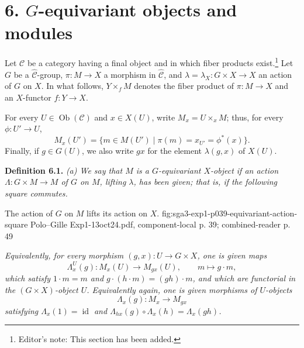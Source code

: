 
\section*{6. \(G\)-equivariant objects and modules}

Let \(\mathscr C\) be a category having a final object and in which fiber
products exist.\footnote{Editor's note: This section has been added.}
Let \(G\) be a \(\widehat{\mathscr C}\)-group,
\(\pi:M\to X\) a morphism in \(\widehat{\mathscr C}\), and
\(\lambda=\lambda_X:G\times X\to X\) an action of \(G\) on \(X\).
In what follows, \(Y\times_f M\) denotes the fiber product of
\(\pi:M\to X\) and an \(X\)-functor \(f:Y\to X\).

For every \(U\in\operatorname{Ob}(\mathscr C)\) and \(x\in X(U)\), write
\(M_x=U\times_x M\); thus, for every \(\phi:U'\to U\),
\[
  M_x(U')
  =\{m\in M(U')\mid \pi(m)=x_{U'}=\phi^*(x)\}.
\]
Finally, if \(g\in G(U)\), we also write \(gx\) for the element
\(\lambda(g,x)\) of \(X(U)\).

\medskip
\noindent\textbf{Definition 6.1.}
\textit{(a) We say that \(M\) is a \(G\)-equivariant \(X\)-object if an
action \(\Lambda:G\times M\to M\) of \(G\) on \(M\), lifting
\(\lambda\), has been given; that is, if the following square commutes.}

  {The action of \(G\) on \(M\) lifts its action on \(X\).}
  {fig:sga3-exp1-p039-equivariant-action-square}
  {Polo--Gille Exp1-13oct24.pdf, component-local p. 39; combined-reader p. 49}

\textit{Equivalently, for every morphism
\((g,x):U\to G\times X\), one is given maps}
\[
  \Lambda_x^U(g):M_x(U)\longrightarrow M_{gx}(U),
  \qquad m\longmapsto g\cdot m,
\]
\textit{which satisfy \(1\cdot m=m\) and
\(g\cdot(h\cdot m)=(gh)\cdot m\), and which are functorial in the
\((G\times X)\)-object \(U\). Equivalently again, one is given morphisms
of \(U\)-objects}
\[
  \Lambda_x(g):M_x\longrightarrow M_{gx}
\]
\textit{satisfying
\(\Lambda_x(1)=\operatorname{id}\) and
\(\Lambda_{hx}(g)\circ\Lambda_x(h)=\Lambda_x(gh)\).}

